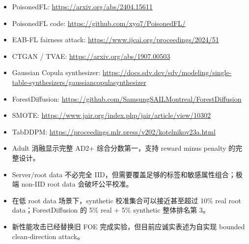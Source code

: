 \documentclass[10.5pt]{article}
\newcommand{\sectiontitle}[1]{\vspace{0.55em}{\Large\bfseries\color{headblue}#1}\par\vspace{0.15em}}
\begin{document}
\begin{itemize}
  \item PoisonedFL: \href{https://arxiv.org/abs/2404.15611}{https://arxiv.org/abs/2404.15611}
  \item PoisonedFL code: \href{https://github.com/xyq7/PoisonedFL/}{https://github.com/xyq7/PoisonedFL/}
  \item EAB-FL fairness attack: \href{https://www.ijcai.org/proceedings/2024/51}{https://www.ijcai.org/proceedings/2024/51}
  \item CTGAN / TVAE: \href{https://arxiv.org/abs/1907.00503}{https://arxiv.org/abs/1907.00503}
  \item Gaussian Copula synthesizer: \href{https://docs.sdv.dev/sdv/modeling/single-table-synthesizers/gaussiancopulasynthesizer}{https://docs.sdv.dev/sdv/modeling/single-table-synthesizers/gaussiancopulasynthesizer}
  \item ForestDiffusion: \href{https://github.com/SamsungSAILMontreal/ForestDiffusion}{https://github.com/SamsungSAILMontreal/ForestDiffusion}
  \item SMOTE: \href{https://www.jair.org/index.php/jair/article/view/10302}{https://www.jair.org/index.php/jair/article/view/10302}
  \item TabDDPM: \href{https://proceedings.mlr.press/v202/kotelnikov23a.html}{https://proceedings.mlr.press/v202/kotelnikov23a.html}
\end{itemize}

\sectiontitle{8. 建议给导师汇报的核心结论}

\begin{itemize}
  \item Adult 消融显示完整 AD2+ 综合分数第一，支持 reward minus penalty 的完整设计。
  \item Server/root data 不必完全 IID，但需要覆盖足够的标签和敏感属性组合；极端 non-IID root data 会破坏公平校准。
  \item 在低 root data 场景下，synthetic 校准集合可以接近甚至超过 10\% real root data；ForestDiffusion 的 5\% real + 5\% synthetic 整体排名第 3。
  \item 新性能攻击已经替换旧 FOE 完成实验，但目前应诚实表述为自实现 bounded clean-direction attack。
\end{itemize}
\end{document}
